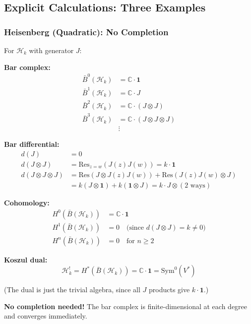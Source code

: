 \subsection{Explicit Calculations: Three Examples}

\subsubsection{Heisenberg (Quadratic): No Completion}

\begin{example}\label{ex:heisenberg-bar-explicit}
For $\mathcal{H}_k$ with generator $J$:

\textbf{Bar complex:}
\begin{align}
\bar{B}^0(\mathcal{H}_k) &= \mathbb{C} \cdot \mathbf{1} \\
\bar{B}^1(\mathcal{H}_k) &= \mathbb{C} \cdot J \\
\bar{B}^2(\mathcal{H}_k) &= \mathbb{C} \cdot (J \otimes J) \\
\bar{B}^3(\mathcal{H}_k) &= \mathbb{C} \cdot (J \otimes J \otimes J) \\
&\vdots
\end{align}

\textbf{Bar differential:}
\begin{align}
d(J) &= 0 \\
d(J \otimes J) &= \text{Res}_{z=w}(J(z)J(w)) = k \cdot \mathbf{1} \\
d(J \otimes J \otimes J) &= \text{Res}(J \otimes J(z)J(w)) + \text{Res}(J(z)J(w) \otimes J) \\
&= k(J \otimes \mathbf{1}) + k(\mathbf{1} \otimes J) = k \cdot J \otimes (2 \text{ ways})
\end{align}

\textbf{Cohomology:}
\begin{align}
H^0(\bar{B}(\mathcal{H}_k)) &= \mathbb{C} \cdot \mathbf{1} \\
H^1(\bar{B}(\mathcal{H}_k)) &= 0 \quad \text{(since $d(J \otimes J) = k \neq 0$)} \\
H^n(\bar{B}(\mathcal{H}_k)) &= 0 \quad \text{for } n \geq 2
\end{align}

\textbf{Koszul dual:}
$$\mathcal{H}_k^! = H^*(\bar{B}(\mathcal{H}_k)) = \mathbb{C} \cdot \mathbf{1} = \text{Sym}^0(V^*)$$

(The dual is just the trivial algebra, since all $J$ products give $k \cdot \mathbf{1}$.)

\textbf{No completion needed!} The bar complex is finite-dimensional at each degree and 
converges immediately.
\end{example}

